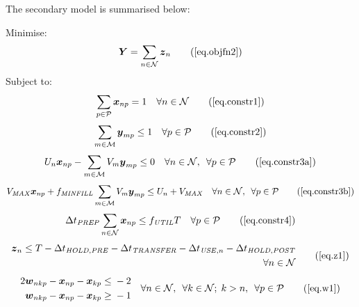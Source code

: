 The secondary model is summarised below:

Minimise:
\begin{equation}
    \boldsymbol{Y} = \sum_{n \in \mathcal{N}} \boldsymbol{z}_{n}
    \tag{\ref{eq.objfn2}}
\end{equation}
Subject to:
\begin{equation}
    \sum_{p \in \mathcal{P}} \boldsymbol{x}_{np} = 1 \quad \forall n \in
    \mathcal{N}
    \tag{\ref{eq.constr1}}
\end{equation}
\begin{equation}
    \sum_{m \in \mathcal{M}} \boldsymbol{y}_{mp} \le 1 \quad \forall p \in
    \mathcal{P}
    \tag{\ref{eq.constr2}}
\end{equation}
\begin{equation}
    U_{n} \boldsymbol{x}_{np} - \sum_{m \in \mathcal{M}} V_{m}
    \boldsymbol{y}_{mp} \le 0 \quad \forall n \in \mathcal{N}, \enspace \forall
    p \in \mathcal{P}
    \tag{\ref{eq.constr3a}}
\end{equation}
\begin{equation}
    V_{\mathit{MAX}} \boldsymbol{x}_{np} + f_{\mathit{MINFILL}} \sum_{m \in 
    \mathcal{M}} V_{m} \boldsymbol{y}_{mp} \le U_{n} + V_{\mathit{MAX}} \quad
    \forall n \in \mathcal{N}, \enspace \forall p \in \mathcal{P}
    \tag{\ref{eq.constr3b}}
\end{equation}
\begin{equation}
    \Delta t_{\mathit{PREP}} \sum_{n \in \mathcal{N}} \boldsymbol{x}_{np} \le
    f_{\mathit{UTIL}} T \quad \forall p \in \mathcal{P}
    \tag{\ref{eq.constr4}}
\end{equation}
\begin{equation}
    \begin{aligned}
        \boldsymbol{z}_{n} \le T - \Delta t_{\mathit{HOLD,PRE}}
        - \Delta t_{\mathit{TRANSFER}} - \Delta t_{\mathit{USE},n}
        - \Delta t_{\mathit{HOLD,POST}}\\
        \quad \forall n \in \mathcal{N}
    \end{aligned}
    \tag{\ref{eq.z1}}
\end{equation}
\begin{equation}
    \begin{split}
        \begin{alignedat}{11}
            2&\boldsymbol{w}_{nkp} {}-{} &&\boldsymbol{x}_{np}
            {}-{} && \boldsymbol{x}_{kp} {}&&\le{} &{}-{} 2\\
            &\boldsymbol{w}_{nkp} {}-{} &&\boldsymbol{x}_{np}
            {}-{} && \boldsymbol{x}_{kp} {}&&\ge{} &{}-{} 1\\
        \end{alignedat}
    \end{split}
    \quad
    \begin{split}
        \forall n \in \mathcal{N}, \enspace \forall k \in \mathcal{N}; \;
        k > n, \enspace \forall p \in \mathcal{P}
    \end{split}
    \tag{\ref{eq.w1}}
\end{equation}
